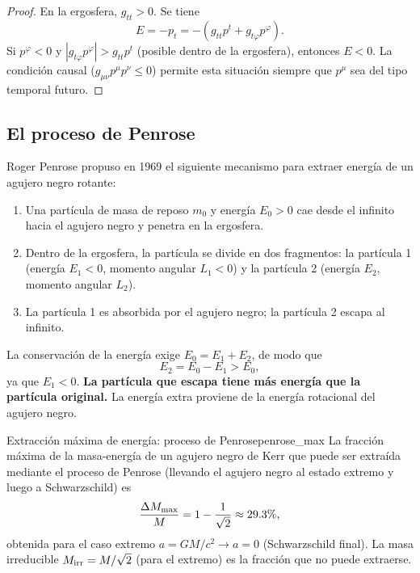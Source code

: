 \begin{proof}
En la ergosfera, $g_{tt} > 0$. Se tiene
\begin{equation}
  E = -p_t = -(g_{tt}p^t + g_{t\varphi}p^\varphi).
\end{equation}
Si $p^\varphi < 0$ y $|g_{t\varphi}p^\varphi| > g_{tt}p^t$ (posible dentro de la ergosfera), entonces $E < 0$. La condición causal ($g_{\mu\nu}p^\mu p^\nu \leq 0$) permite esta situación siempre que $p^\mu$ sea del tipo temporal futuro.
\end{proof}

\subsection{El proceso de Penrose}

Roger Penrose propuso en 1969 el siguiente mecanismo para extraer energía de un agujero negro rotante:

\begin{enumerate}[leftmargin=2em, label=\textbf{Paso \arabic*.}]
  \item Una partícula de masa de reposo $m_0$ y energía $E_0 > 0$ cae desde el infinito hacia el agujero negro y penetra en la ergosfera.
  \item Dentro de la ergosfera, la partícula se divide en dos fragmentos: la partícula 1 (energía $E_1 < 0$, momento angular $L_1 < 0$) y la partícula 2 (energía $E_2$, momento angular $L_2$).
  \item La partícula 1 es absorbida por el agujero negro; la partícula 2 escapa al infinito.
\end{enumerate}

La conservación de la energía exige $E_0 = E_1 + E_2$, de modo que
\begin{equation}
  E_2 = E_0 - E_1 > E_0,
  \label{eq:penrose_energia}
\end{equation}
ya que $E_1 < 0$. \textbf{La partícula que escapa tiene más energía que la partícula original.} La energía extra proviene de la energía rotacional del agujero negro.

\begin{teorema}{Extracción máxima de energía: proceso de Penrose}{penrose_max}
La fracción máxima de la masa-energía de un agujero negro de Kerr que puede ser extraída mediante el proceso de Penrose (llevando el agujero negro al estado extremo y luego a Schwarzschild) es
\begin{equation}
  \frac{\Delta M_{\rm max}}{M} = 1 - \frac{1}{\sqrt{2}} \approx 29.3\%,
  \label{eq:penrose_maximo}
\end{equation}
obtenida para el caso extremo $a = GM/c^2 \to a = 0$ (Schwarzschild final). La masa irreducible $M_{\rm irr} = M/\sqrt{2}$ (para el extremo) es la fracción que no puede extraerse.
\end{teorema}

